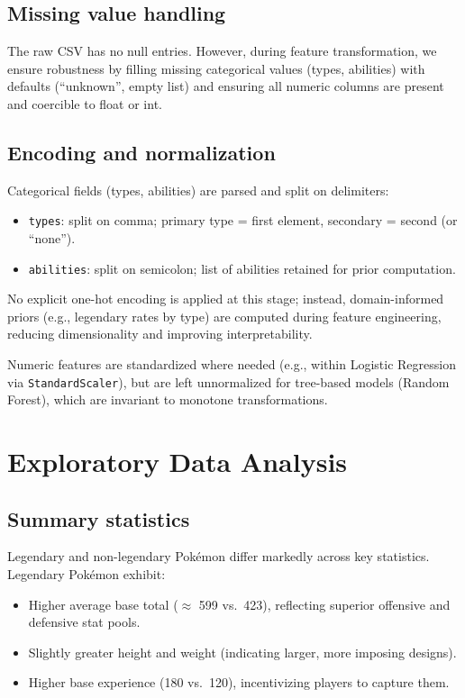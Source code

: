 \subsection{Missing value handling}

The raw CSV has no null entries. However, during feature transformation, we ensure robustness by filling missing categorical values (types, abilities) with defaults (``unknown'', empty list) and ensuring all numeric columns are present and coercible to float or int.

\subsection{Encoding and normalization}

Categorical fields (types, abilities) are parsed and split on delimiters:
\begin{itemize}
  \item \texttt{types}: split on comma; primary type = first element, secondary = second (or ``none'').
  \item \texttt{abilities}: split on semicolon; list of abilities retained for prior computation.
\end{itemize}

No explicit one-hot encoding is applied at this stage; instead, domain-informed priors (e.g., legendary rates by type) are computed during feature engineering, reducing dimensionality and improving interpretability.

Numeric features are standardized where needed (e.g., within Logistic Regression via \texttt{StandardScaler}), but are left unnormalized for tree-based models (Random Forest), which are invariant to monotone transformations.

\section{Exploratory Data Analysis}
\label{sec:eda}

\subsection{Summary statistics}

Legendary and non-legendary Pokémon differ markedly across key statistics. Legendary Pokémon exhibit:
\begin{itemize}
  \item Higher average base total ($\approx$ 599 vs.~423), reflecting superior offensive and defensive stat pools.
  \item Slightly greater height and weight (indicating larger, more imposing designs).
  \item Higher base experience (180 vs.~120), incentivizing players to capture them.
\end{itemize}

